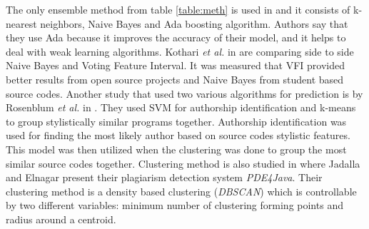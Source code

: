 \documentclass[english]{tktltiki2}
\theoremstyle{definition}
\theoremstyle{remark}
\begin{document}
\noindent
\noindent
The only ensemble method from table \ref{table:meth} is used in \cite{bandara2011machine} and it consists of k-nearest neighbors, Naive Bayes and Ada boosting algorithm. Authors say that they use Ada because it improves the accuracy of their model, and it helps to deal with weak learning algorithms. Kothari \textit{et al.} in \cite{kothari2007probabilistic} are comparing side to side Naive Bayes and Voting Feature Interval. It was measured that VFI provided better results from open source projects and Naive Bayes from student based source codes. Another study that used two various algorithms for prediction is by Rosenblum \textit{et al.} in \cite{rosenblum2011wrote}. They used SVM for authorship identification and k-means to group stylistically similar programs together. Authorship identification was used for finding the most likely author based on source codes stylistic features. This model was then utilized when the clustering was done to group the most similar source codes together. Clustering method is also studied in \cite{jadalla2008pde4java} where Jadalla and Elnagar present their plagiarism detection system \textit{PDE4Java}. Their clustering method is a density based clustering (\textit{DBSCAN}) which is controllable by two different variables: minimum number of clustering forming points and radius around a centroid. 
\end{document}
